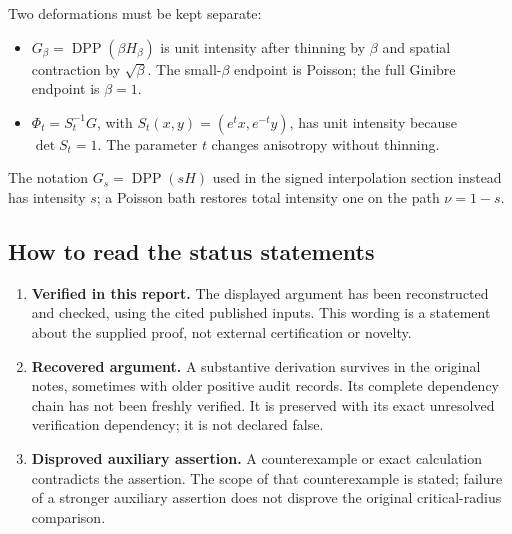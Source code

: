\documentclass[11pt,a4paper]{article}
\theoremstyle{definition}
\theoremstyle{remark}
\numberwithin{equation}{section}
\begin{document}
Two deformations must be kept separate:
\begin{itemize}
\item \(G_\beta=\operatorname{DPP}(\beta H_\beta)\) is unit intensity
after thinning by \(\beta\) and spatial contraction by \(\sqrt\beta\).
The small-\(\beta\) endpoint is Poisson; the full Ginibre endpoint is
\(\beta=1\).
\item \(\Phi_t=S_t^{-1}G\), with
\(S_t(x,y)=(e^t x,e^{-t}y)\), has unit intensity because
\(\det S_t=1\). The parameter \(t\) changes anisotropy without thinning.
\end{itemize}
The notation \(G_s=\operatorname{DPP}(sH)\) used in the signed
interpolation section instead has intensity \(s\); a Poisson bath restores
total intensity one on the path \(\nu=1-s\).

\subsection*{How to read the status statements}
\begin{enumerate}[leftmargin=*]
\item \textbf{Verified in this report.} The displayed argument has been
reconstructed and checked, using the cited published inputs. This wording
is a statement about the supplied proof, not external certification or novelty.
\item \textbf{Recovered argument.} A substantive derivation survives in
the original notes, sometimes with older positive audit records. Its
complete dependency chain has not been freshly verified. It is preserved
with its exact unresolved verification dependency; it is not declared false.
\item \textbf{Disproved auxiliary assertion.} A counterexample or exact
calculation contradicts the assertion. The scope of that counterexample
is stated; failure of a stronger auxiliary assertion does not disprove
the original critical-radius comparison.
\end{enumerate}
\end{document}
